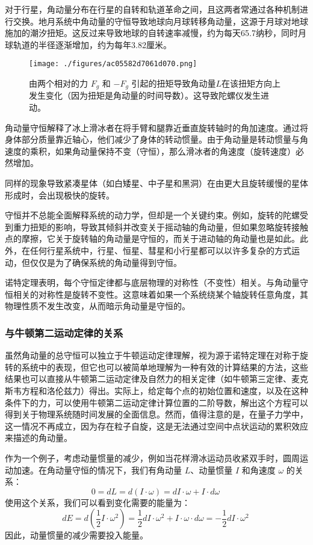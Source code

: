 对于行星，角动量分布在行星的自转和轨道革命之间，且这两者常通过各种机制进行交换。地月系统中角动量的守恒导致地球向月球转移角动量，这源于月球对地球施加的潮汐扭矩。这反过来导致地球的自转速率减慢，约为每天65.7纳秒，同时月球轨道的半径逐渐增加，约为每年3.82厘米。
\begin{figure}[ht]
\centering
\texttt{[image: ./figures/ac05582d7061d070.png]}
\caption{由两个相对的力 \( F_g \) 和 \( -F_g \) 引起的扭矩导致角动量\(L\)在该扭矩方向上发生变化（因为扭矩是角动量的时间导数）。这导致陀螺仪发生进动。} \label{fig_JDL_5}
\end{figure}
角动量守恒解释了冰上滑冰者在将手臂和腿靠近垂直旋转轴时的角加速度。通过将身体部分质量靠近轴心，他们减少了身体的转动惯量。由于角动量是转动惯量与角速度的乘积，如果角动量保持不变（守恒），那么滑冰者的角速度（旋转速度）必然增加。

同样的现象导致紧凑星体（如白矮星、中子星和黑洞）在由更大且旋转缓慢的星体形成时，会出现极快的旋转。

守恒并不总能全面解释系统的动力学，但却是一个关键约束。例如，旋转的陀螺受到重力扭矩的影响，导致其倾斜并改变关于摇动轴的角动量，但如果忽略旋转接触点的摩擦，它关于旋转轴的角动量是守恒的，而关于进动轴的角动量也是如此。此外，在任何行星系统中，行星、恒星、彗星和小行星都可以以许多复杂的方式运动，但仅仅是为了确保系统的角动量得到守恒。

诺特定理表明，每个守恒定律都与底层物理的对称性（不变性）相关。与角动量守恒相关的对称性是旋转不变性。这意味着如果一个系统绕某个轴旋转任意角度，其物理性质不发生改变，从而暗示角动量是守恒的。
\subsubsection{与牛顿第二运动定律的关系} 
虽然角动量的总守恒可以独立于牛顿运动定律理解，视为源于诺特定理在对称于旋转的系统中的表现，但它也可以被简单地理解为一种有效的计算结果的方法，这些结果也可以直接从牛顿第二运动定律及自然力的相关定律（如牛顿第三定律、麦克斯韦方程和洛伦兹力）得出。实际上，给定每个点的初始位置和速度，以及在这种条件下的力，可以使用牛顿第二运动定律计算位置的二阶导数，解出这个方程可以得到关于物理系统随时间发展的全面信息。然而，值得注意的是，在量子力学中，这一情况不再成立，因为存在粒子自旋，这是无法通过空间中点状运动的累积效应来描述的角动量。

作为一个例子，考虑动量惯量的减少，例如当花样滑冰运动员收紧双手时，圆周运动加速。在角动量守恒的情况下，我们有角动量 \( L \)、动量惯量 \( I \) 和角速度 \( \omega \) 的关系：
\[
0 = dL = d(I \cdot \omega) = dI \cdot \omega + I \cdot d\omega~
\]
使用这个关系，我们可以看到变化需要的能量为：
\[
dE = d\left(\frac{1}{2} I \cdot \omega^2\right) = \frac{1}{2} dI \cdot \omega^2 + I \cdot \omega \cdot d\omega = -\frac{1}{2} dI \cdot \omega^2~
\]
因此，动量惯量的减少需要投入能量。

